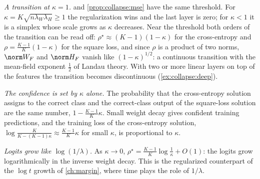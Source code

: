 \begin{refsection}
\emph{A transition at $\kappa=1$.}  and \cref{prop:collapse:mse} have the same threshold. For $\kappa=K\sqrt{n\lambda_W\lambda_H}\ge1$ the regularization wins and the last layer is zero; for $\kappa<1$ it is a simplex whose scale grows as $\kappa$ decreases. Near the threshold both orders of the transition can be read off: $\rho^\star\approx(K-1)(1-\kappa)$ for the cross-entropy and $\rho=\frac{K-1}K(1-\kappa)$ for the square loss, and since $\rho$ is a product of two norms, $\norm W_F$ and $\norm H_F$ vanish like $(1-\kappa)^{1/2}$: a continuous transition with the mean-field exponent $\frac12$ of Landau theory. With two or more linear layers on top of the features the transition becomes discontinuous (\cref{ex:collapse:deep}).

\emph{The confidence is set by $\kappa$ alone.} The probability that the cross-entropy solution assigns to the correct class and the correct-class output of the square-loss solution are the same number, $1-\frac{K-1}K\kappa$. Small weight decay gives confident training predictions, and the training loss of the cross-entropy solution, $\log\frac K{K-(K-1)\kappa}\approx\frac{K-1}K\kappa$ for small $\kappa$, is proportional to $\kappa$.

\emph{Logits grow like $\log(1/\lambda)$.} As $\kappa\to0$, $\rho^\star=\frac{K-1}K\log\frac1\kappa+O(1)$: the logits grow logarithmically in the inverse weight decay. This is the regularized counterpart of the $\log t$ growth of \cref{ch:margin}, where time plays the role of $1/\lambda$.


\end{refsection}
